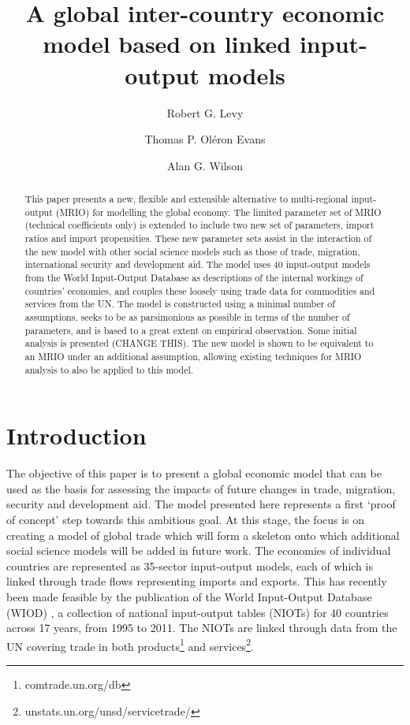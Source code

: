 \documentclass[a4paper]{article}
\title{A global inter-country economic model based on linked input-output models}
\author[*]{Robert G. Levy}
\author[**]{Thomas P. Ol\'{e}ron Evans}
\author[*]{Alan G. Wilson}
\affil[*]{Centre for Advanced Spatial Analysis, UCL Bartlett Faculty of the Built Environment,
90 Tottenham Court Road, London W1T 4TJ, UK}
\affil[**]{Department of Mathematics, University College London, Gower Street, London WC1E 6BT, UK}
\begin{document}
\maketitle

\begin{abstract}
This paper presents a new, flexible and extensible alternative to multi-regional input-output (MRIO) for modelling the global economy.
The limited parameter set of MRIO (technical coefficients only) is extended to include two new set of parameters, import ratios and import propensities.
These new parameter sets assist in the interaction of the new model with other social science models such as those of trade, migration, international security and development aid.
The model uses 40 input-output models from the World Input-Output Database as descriptions of the internal workings of countries' economies, and couples these loosely using trade data for commodities and services from the UN.
The model is constructed using a minimal number of assumptions, seeks to be as parsimonious as possible in terms of the number of parameters, and is based to a great extent on empirical observation.
Some initial analysis is presented (CHANGE THIS).
The new model is shown to be equivalent to an MRIO under an additional assumption, allowing existing techniques for MRIO analysis to also be applied to this model.
\end{abstract}

\section{Introduction}
The objective of this paper is to present a global economic model that can be used as the basis for assessing the impacts of future changes in trade, migration, security and development aid.
The model presented here represents a first `proof of concept' step towards this ambitious goal.
At this stage, the focus is on creating a model of global trade which will form a skeleton onto which additional social science models will be added in future work.
The economies of individual countries are represented as 35-sector input-output models, each of which is linked through trade flows representing imports and exports.
This has recently been made feasible by the publication of the World Input-Output Database (WIOD) \parencite{timmer_world_2012}, a collection of national input-output tables (NIOTs) for 40 countries across 17 years, from 1995 to 2011.
The NIOTs are linked through data from the UN covering trade in both products\footnote{comtrade.un.org/db} and services\footnote{unstats.un.org/unsd/servicetrade/}.
\end{document}
